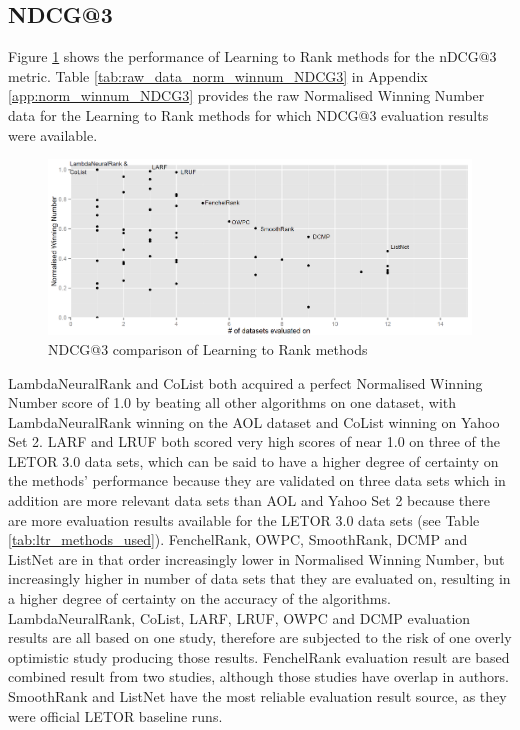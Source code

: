 \subsection{NDCG@3}
Figure \ref{fig:normalised_winning_number_NDCG3} shows the performance of Learning to Rank methods for the \ac{nDCG}@3 metric. Table \ref{tab:raw_data_norm_winnum_NDCG3} in Appendix \ref{app:norm_winnum_NDCG3} provides the raw Normalised Winning Number data for the Learning to Rank methods for which \ac{NDCG}@3 evaluation results were available.\\

\begin{figure}[!h]
\includegraphics[scale=0.285]{gfx/ndcg3_winnum}
\caption{\acs{NDCG}@3 comparison of Learning to Rank methods}
\label{fig:normalised_winning_number_NDCG3}
\end{figure}

LambdaNeuralRank and CoList both acquired a perfect Normalised Winning Number score of 1.0 by beating all other algorithms on one dataset, with LambdaNeuralRank winning on the AOL dataset and CoList winning on Yahoo Set 2. LARF and LRUF both scored very high scores of near 1.0 on three of the LETOR 3.0 data sets, which can be said to have a higher degree of certainty on the methods' performance because they are validated on three data sets which in addition are more relevant data sets than AOL and Yahoo Set 2 because there are more evaluation results available for the LETOR 3.0 data sets (see Table \ref{tab:ltr_methods_used}). FenchelRank, OWPC, SmoothRank, DCMP and ListNet are in that order increasingly lower in Normalised Winning Number, but increasingly higher in number of data sets that they are evaluated on, resulting in a higher degree of certainty on the accuracy of the algorithms.\\

LambdaNeuralRank, CoList, LARF, LRUF, OWPC and DCMP evaluation results are all based on one study, therefore are subjected to the risk of one overly optimistic study producing those results. FenchelRank evaluation result are based combined result from two studies, although those studies have overlap in authors. SmoothRank and ListNet have the most reliable evaluation result source, as they were official LETOR baseline runs.  

